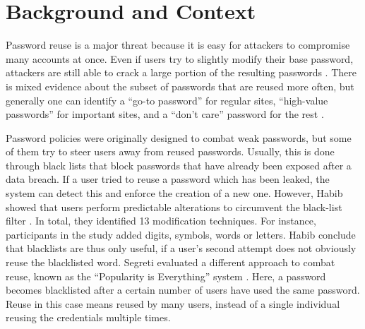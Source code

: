 \section{Background and Context}
Password reuse is a major threat because it is easy for attackers to compromise many accounts at once. Even if users try to slightly modify their base password, attackers are still able to crack a large portion of the resulting passwords \cite{Das2014TangledWeb,Jaeger2016AnalysisOfLeaks}. There is mixed evidence about the subset of passwords that are reused more often, but generally one can identify a ``go-to password'' for regular sites, ``high-value passwords'' for important sites, and a ``don't care'' password for the rest \cite{Bailey2014StatisticsReuse,Stobert2014PasswordLifeCycle, Haque2014Hierarchy, Florencio2007LargeScaleStudyPasswordHabits, Stobert2015ExpertPassword, Ur2015PWCreationLab,Wash2016UnderstandingPasswordChoices}. 

Password policies were originally designed to combat weak passwords, but some of them try to steer users away from reused passwords. Usually, this is done through black lists that block passwords that have already been exposed after a data breach. If a user tried to reuse a password which has been leaked, the system can detect this and enforce the creation of a new one. However, Habib \etal showed that users perform predictable alterations to circumvent the black-list filter \cite{Habib2017Blacklists}. In total, they identified 13 modification techniques. For instance, participants in the study added digits, symbols, words or letters. Habib \etal conclude that blacklists are thus only useful, if a user's second attempt does not obviously reuse the blacklisted word. Segreti \etal evaluated a different approach to combat reuse, known as the ``Popularity is Everything'' system \cite{Segreti2017AdaptivePolicies}. Here, a password becomes blacklisted after a certain number of users have used the same password. Reuse in this case means reused by many users, instead of a single individual reusing the credentials multiple times. 

